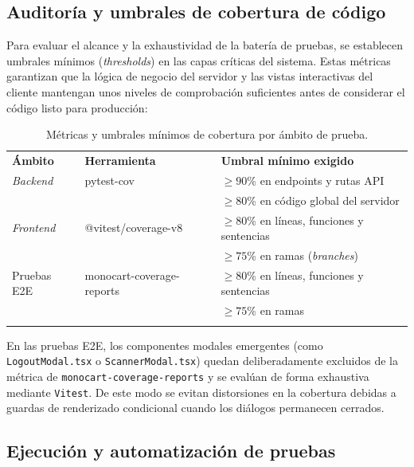 \subsection{Auditoría y umbrales de cobertura de código}\label{subsec:metricas_cobertura}

Para evaluar el alcance y la exhaustividad de la batería de pruebas, se establecen umbrales mínimos (\textit{thresholds}) en las capas críticas del sistema. Estas métricas garantizan que la lógica de negocio del servidor y las vistas interactivas del cliente mantengan unos niveles de comprobación suficientes antes de considerar el código listo para producción:

\begin{table}[H]
  \centering
  \small
  \renewcommand{\arraystretch}{1.3}
  \begin{tabularx}{\textwidth}{l l Y}
    \bighline
    \textbf{Ámbito} & \textbf{Herramienta} & \textbf{Umbral mínimo exigido} \\
    \bighline
    \textit{Backend} & pytest-cov & $\ge 90$\% en endpoints y rutas API \\
                     &            & $\ge 80$\% en código global del servidor \\
    \hline
    \textit{Frontend} & @vitest/coverage-v8 & $\ge 80$\% en líneas, funciones y sentencias \\
                      &                     & $\ge 75$\% en ramas (\textit{branches}) \\
    \hline
    Pruebas E2E & monocart-coverage-reports & $\ge 80$\% en líneas, funciones y sentencias \\
                &                           & $\ge 75$\% en ramas \\
    \bighline
  \end{tabularx}
  \caption{Métricas y umbrales mínimos de cobertura por ámbito de prueba.}
  \label{tab:umbrales_cobertura}
\end{table}

En las pruebas E2E, los componentes modales emergentes (como \texttt{LogoutModal.tsx} o \texttt{ScannerModal.tsx}) quedan deliberadamente excluidos de la métrica de \texttt{monocart-coverage-reports} y se evalúan de forma exhaustiva mediante \texttt{Vitest}. De este modo se evitan distorsiones en la cobertura debidas a guardas de renderizado condicional cuando los diálogos permanecen cerrados.

\subsection{Ejecución y automatización de pruebas}\label{subsec:ejecucion_pruebas}

